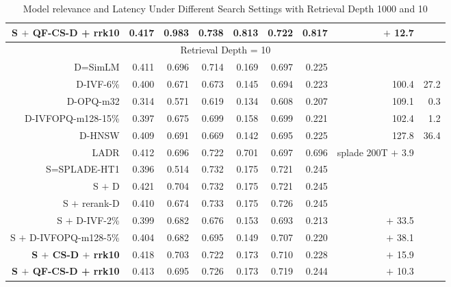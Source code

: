 {\begin{table*}[htbp]
\begin{small}
\begin{tabular}{ r r r |r r  |r r  |r r}
       \bf S $+$ QF-CS-D + rrk10 &  0.417 & 0.983 &  0.738 & 0.813 & 0.722 & 0.817 & $+$ 12.7 & \\
       \hline
       \multicolumn{9}{c}{Retrieval Depth = 10}\\
       D=SimLM & 0.411 & 0.696 & 0.714 & 0.169 &  0.697 &        0.225 &  \\
            D-IVF-6\% &  0.400 & 0.671 & 0.673 & 0.145 & 0.694 & 0.223 & 100.4 & 27.2 \\
            D-OPQ-m32 & 0.314 & 0.571 & 0.619 & 0.134 & 0.608 & 0.207 & 109.1 & 0.3 \\
            D-IVFOPQ-m128-15\% & 0.397 & 0.675 & 0.699 & 0.158 & 0.699 & 0.221 & 102.4 & 1.2 \\
            D-HNSW & 0.409 & 0.691 & 0.669 & 0.142 & 0.695 & 0.225 & 127.8 & 36.4  \\
            LADR & 0.412 & 0.696 & 0.722 & 0.701 & 0.697 & 0.696 & splade 200T $+$ 3.9 &  \\
           S=SPLADE-HT1 & 0.396 & 0.514 &  0.732   &  0.175 & 0.721    & 0.245 &  \\
          S $+$ D  & 0.421 & 0.704 & 0.732 & 0.175 & 0.721 & 0.245 & & \\
            S $+$ rerank-D &  0.410 & 0.674 & 0.733 & 0.175 & 0.726 & 0.245  &  \\
            S $+$ D-IVF-2\% & 0.399 & 0.682  & 0.676 & 0.153 & 0.693 & 0.213 &  $+$ 33.5 & \\
           S $+$ D-IVFOPQ-m128-5\% & 0.404 & 0.682 & 0.695 & 0.149 & 0.707 & 0.220 &  $+$ 38.1 & \\
            \bf S $+$ CS-D $+$  rrk10 & 0.418 & 0.703 & 0.722 & 0.173 & 0.710 & 0.228 & $+$ 15.9 &  \\
       \bf S $+$ QF-CS-D + rrk10 &  0.413 & 0.695 & 0.726 & 0.173 & 0.719 & 0.244 & $+$ 10.3 & \\

			\hline\hline
		\end{tabular}
		\end{small}
	\caption{Model relevance and Latency Under Different Search Settings with Retrieval Depth 1000 and 10
}
	\label{tab:main1k}
\end{table*}
}

